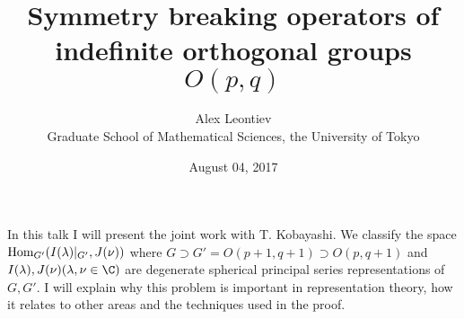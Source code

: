 \documentclass[8pt]{article} %
\title{Symmetry breaking operators of indefinite orthogonal groups $O(p,q)$}
\author{Alex Leontiev\\Graduate School of Mathematical Sciences, the University of Tokyo}
\date{August 04, 2017}
\newcommand{\Hom}{\mbox{\normalfont Hom}}
\theoremstyle{definition}
\begin{document}
\maketitle
In this talk I will present the joint work with T. Kobayashi.
We classify the space $\Hom_{G'}(I(\lambda)\kern-0.1cm\mid_{G'},J(\nu))$ where $G\supset G'=O(p+1,q+1)\supset O(p,q+1)$ and $I(\lambda),J(\nu)(\lambda,\nu\in\C)$ are
degenerate spherical principal series representations of $G,G'$.
I will explain why this problem is important in representation theory, how it relates to other areas
and the techniques used in the proof.
\end{document}
